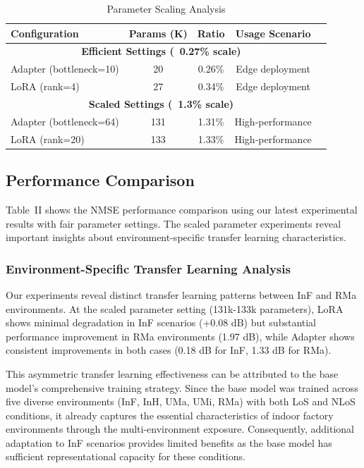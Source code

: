 \documentclass[conference]{IEEEtran}
\begin{document}
\begin{table}[t]
\centering
\caption{Parameter Scaling Analysis}
\label{tab:parameter_scaling}
\begin{tabular}{@{}lcccc@{}}
\toprule
\textbf{Configuration} & \textbf{Params (K)} & \textbf{Ratio} & \textbf{Usage Scenario} \\
\midrule
\multicolumn{4}{c}{\textbf{Efficient Settings (~0.27\% scale)}} \\
\midrule
Adapter (bottleneck=10) & 20 & 0.26\% & Edge deployment \\
LoRA (rank=4) & 27 & 0.34\% & Edge deployment \\
\midrule
\multicolumn{4}{c}{\textbf{Scaled Settings (~1.3\% scale)}} \\
\midrule
Adapter (bottleneck=64) & 131 & 1.31\% & High-performance \\
LoRA (rank=20) & 133 & 1.33\% & High-performance \\
\bottomrule
\end{tabular}
\end{table}

\subsection{Performance Comparison}

Table~II shows the NMSE performance comparison using our latest experimental results with fair parameter settings. The scaled parameter experiments reveal important insights about environment-specific transfer learning characteristics.

\subsubsection{Environment-Specific Transfer Learning Analysis}
Our experiments reveal distinct transfer learning patterns between InF and RMa environments. At the scaled parameter setting (131k-133k parameters), LoRA shows minimal degradation in InF scenarios (+0.08 dB) but substantial performance improvement in RMa environments (1.97 dB), while Adapter shows consistent improvements in both cases (0.18 dB for InF, 1.33 dB for RMa).

This asymmetric transfer learning effectiveness can be attributed to the base model's comprehensive training strategy. Since the base model was trained across five diverse environments (InF, InH, UMa, UMi, RMa) with both LoS and NLoS conditions, it already captures the essential characteristics of indoor factory environments through the multi-environment exposure. Consequently, additional adaptation to InF scenarios provides limited benefits as the base model has sufficient representational capacity for these conditions.
\end{document}
